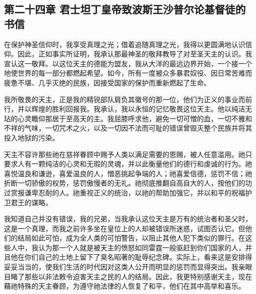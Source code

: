 \subsection{第二十四章 君士坦丁皇帝致波斯王沙普尔论基督徒的书信}

在保护神圣信仰时，我享受真理之光；借着追随真理之光，我得以更圆满地认识信仰。因此，正如事实所证明，我承认那最神圣的敬拜教导了对至圣天主的认识。我宣认这一敬拜。以这位天主的德能为盟友，我从大洋的最远边界开始，一个接一个地使世界的每一部分都燃起希望。如今，所有一度被众多暴君奴役、因日常苦难而疲惫不堪、几乎灭绝的民族，因接受国家的保护而重新燃起了生命。\par

我所敬畏的天主，正是我的精锐部队肩负其徽号的那一位，他们为正义的事业而前行，并以辉煌的胜利回报我。我承认，我以永恒的记忆敬畏这位天主。他以纯洁无玷的心灵瞻仰那居于至高天的主。我屈膝呼求他，避免一切可憎的血，一切不雅和不祥的气味，一切咒术之火，以及一切因不法而可耻的错误曾毁灭整个民族并将其投入地狱的污染。\par

天主不容许那些祂在慈祥眷顾中赐予人类以满足需要的恩赐，被人任意滥用。祂只要求人有一颗纯洁的心灵和无瑕的灵魂，并以此衡量他们的德行和虔诚的行为。祂喜悦温良和谦逊，喜爱温良的人，憎恶挑起争端的人；祂喜爱信德，惩罚不信；祂折断一切骄傲的权势，惩罚傲慢者的无礼。祂彻底推翻自高自大的人，按他们的功过赏报谦卑忍耐的人。祂重视正义的统治，以祂的帮助加强它，并以和平的祝福护卫君王的谋略。\par

我知道自己并没有错误，我的兄弟，当我承认这位天主是万有的统治者和圣父时，这是一个真理，而我之前许多坐在皇位上的人却被错误所迷惑，试图否认它。但他们的结局如此可怕，成为全人类的可怕警告，以阻止其他人犯下类似的罪行。在这些人中，我认为那一个人就是被天主的愤怒如同雷霆一般驱赶到你们国家的人，并且他在你们自己的土地上留下了臭名昭著的耻辱纪念碑。实际上，看来这是安排得妥妥当当的，使我们生活的时代因对这类人公开而明显的惩罚而显得突出。我亲眼目睹了那些以非法敕令迫害天主之民的人的结局。因此，我更特别感谢天主，现在藉祂特殊的天主眷顾，为遵守祂法律的人恢复了和平，他们在其中高举和喜乐。\par

\par

